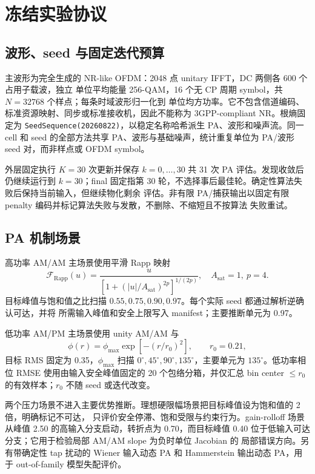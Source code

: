 \documentclass[UTF8,zihao=-4,a4paper]{ctexart}
\begin{document}
\section{冻结实验协议}

\subsection{波形、seed 与固定迭代预算}

主波形为完全生成的 NR-like OFDM：2048 点 unitary IFFT，DC 两侧各 600 个占用子载波，独立
单位平均能量 256-QAM，16 个无 CP 周期 symbol，共 $N=32768$ 个样点；每条时域波形归一化到
单位均方功率。它不包含信道编码、标准资源映射、同步或标准接收机，因此不能称为 3GPP-compliant
NR。根熵固定为 \texttt{SeedSequence(20260822)}，以稳定名称哈希派生 PA、波形和噪声流。同一 cell
和 seed 的全部方法共享 PA、波形与基础噪声，统计重复单位为 PA/波形 seed 对，而非样点或 OFDM
symbol。

外层固定执行 $K=30$ 次更新并保存 $k=0,\ldots,30$ 共 31 次 PA 评估。发现收敛后仍继续运行到
$k=30$；final 固定指第 30 轮，不选择事后最佳轮。确定性算法失败后保持当前输入，但继续物化剩余
评估。非有限 PA/捕获输出以固定有限 penalty 编码并标记算法失败与发散，不删除、不缩短且不按算法
失败重试。

\subsection{PA 机制场景}

高功率 AM/AM 主场景使用平滑 Rapp 映射
\begin{equation}
  \mathcal F_{\mathrm{Rapp}}(u)=
  \frac{u}{\left[1+(|u|/A_{\mathrm{sat}})^{2p}\right]^{1/(2p)}},
  \quad A_{\mathrm{sat}}=1,\ p=4 .
  \label{eq:rapp}
\end{equation}
目标峰值与饱和值之比扫描 $0.55,0.75,0.90,0.97$。每个实际 seed 都通过解析逆确认可达，并将
所需输入峰值和安全上限写入 manifest；主要推断单元为 0.97。

低功率 AM/PM 主场景使用 unity AM/AM 与
\begin{equation}
  \phi(r)=\phi_{\max}\exp[-(r/r_0)^2],
  \qquad r_0=0.21,
  \label{eq:ampm}
\end{equation}
目标 RMS 固定为 0.35，$\phi_{\max}$ 扫描 $0^\circ,45^\circ,90^\circ,135^\circ$，主要单元为
$135^\circ$。低功率相位 RMSE 使用由输入安全峰值固定的 20 个包络分箱，并仅汇总
bin center $\leq r_0$ 的有效样本；$r_0$ 不随 seed 或迭代改变。

两个压力场景不进入主要优势推断。理想硬限幅场景把目标峰值设为饱和值的 2 倍，明确标记不可达，
只评价安全停滞、饱和受限与约束行为。gain-rolloff 场景从峰值 2.50 的高输入分支启动，转折点为
0.70，而目标峰值 0.40 位于低输入可达分支；它用于检验局部 AM/AM slope 为负时单位 Jacobian 的
局部错误方向。另有带确定性 tap 扰动的 Wiener 输入动态 PA 和 Hammerstein 输出动态 PA，用于
out-of-family 模型失配评价。
\end{document}
